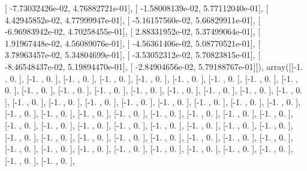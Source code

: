 \documentclass{article}
\begin{document}
       [ -7.73032426e-02,   4.76882721e-01],
       [ -1.58008139e-02,   5.77112040e-01],
       [  4.42945852e-02,   4.77999947e-01],
       [ -5.16157560e-02,   5.66829911e-01],
       [ -6.96983942e-02,   4.70258455e-01],
       [  2.88331952e-02,   5.37499064e-01],
       [  1.91967448e-02,   4.56089076e-01],
       [ -4.56361406e-02,   5.08770521e-01],
       [  3.78963457e-02,   5.34804699e-01],
       [ -3.53052312e-02,   5.70823815e-01],
       [ -8.46548437e-02,   5.19894470e-01],
       [ -2.84904656e-02,   5.79188767e-01]]), array([[-1.        ,  0.        ],
       [-1.        ,  0.        ],
       [-1.        ,  0.        ],
       [-1.        ,  0.        ],
       [-1.        ,  0.        ],
       [-1.        ,  0.        ],
       [-1.        ,  0.        ],
       [-1.        ,  0.        ],
       [-1.        ,  0.        ],
       [-1.        ,  0.        ],
       [-1.        ,  0.        ],
       [-1.        ,  0.        ],
       [-1.        ,  0.        ],
       [-1.        ,  0.        ],
       [-1.        ,  0.        ],
       [-1.        ,  0.        ],
       [-1.        ,  0.        ],
       [-1.        ,  0.        ],
       [-1.        ,  0.        ],
       [-1.        ,  0.        ],
       [-1.        ,  0.        ],
       [-1.        ,  0.        ],
       [-1.        ,  0.        ],
       [-1.        ,  0.        ],
       [-1.        ,  0.        ],
       [-1.        ,  0.        ],
       [-1.        ,  0.        ],
       [-1.        ,  0.        ],
       [-1.        ,  0.        ],
       [-1.        ,  0.        ],
       [-1.        ,  0.        ],
       [-1.        ,  0.        ],
       [-1.        ,  0.        ],
       [-1.        ,  0.        ],
       [-1.        ,  0.        ],
       [-1.        ,  0.        ],
       [-1.        ,  0.        ],
       [-1.        ,  0.        ],
       [-1.        ,  0.        ],
       [-1.        ,  0.        ],
       [-1.        ,  0.        ],
       [-1.        ,  0.        ],
       [-1.        ,  0.        ],
       [-1.        ,  0.        ],
       [-1.        ,  0.        ],
       [-1.        ,  0.        ],
       [-1.        ,  0.        ],
       [-1.        ,  0.        ],
       [-1.        ,  0.        ],
       [-1.        ,  0.        ],
       [-1.        ,  0.        ],
       [-1.        ,  0.        ],
       [-1.        ,  0.        ],
       [-1.        ,  0.        ],
       [-1.        ,  0.        ],
       [-1.        ,  0.        ],
       [-1.        ,  0.        ],
       [-1.        ,  0.        ],
       [-1.        ,  0.        ],
\end{document}
